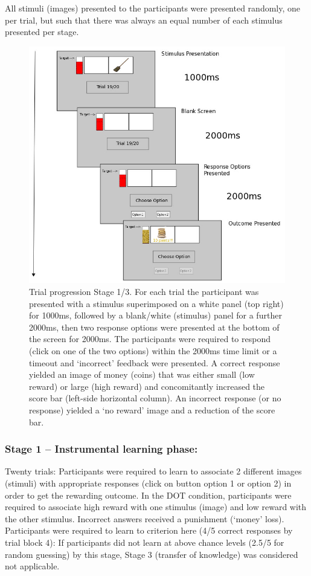 \documentclass[]{elsarticle} %
\begin{document}
All stimuli (images) presented to the participants were presented
randomly, one per trial, but such that there was always an equal number
of each stimulus presented per stage.

\begin{figure}

{\centering \includegraphics[width=0.6\linewidth]{figure3} 

}

\caption{Trial progression Stage 1/3. For each trial the participant was presented with a stimulus superimposed on a white panel (top right) for 1000ms, followed by a blank/white (stimulus) panel for a further 2000ms, then two response options were presented at the bottom of the screen for 2000ms. The participants were required to respond (click on one of the two options) within the 2000ms time limit or a timeout and ‘incorrect’ feedback were presented. A correct response yielded an image of money (coins) that was either small (low reward) or large (high reward) and concomitantly increased the score bar (left-side horizontal column). An incorrect response (or no response) yielded a ‘no reward’ image and a reduction of the score bar.}\label{fig:figure3}
\end{figure}

\hypertarget{stage-1-instrumental-learning-phase}{%
\subsubsection{Stage 1 -- Instrumental learning
phase:}\label{stage-1-instrumental-learning-phase}}

Twenty trials: Participants were required to learn to associate 2
different images (stimuli) with appropriate responses (click on button
option 1 or option 2) in order to get the rewarding outcome. In the DOT
condition, participants were required to associate high reward with one
stimulus (image) and low reward with the other stimulus. Incorrect
answers received a punishment (`money' loss). Participants were required
to learn to criterion here (4/5 correct responses by trial block 4): If
participants did not learn at above chance levels (2.5/5 for random
guessing) by this stage, Stage 3 (transfer of knowledge) was considered
not applicable.
\end{document}
